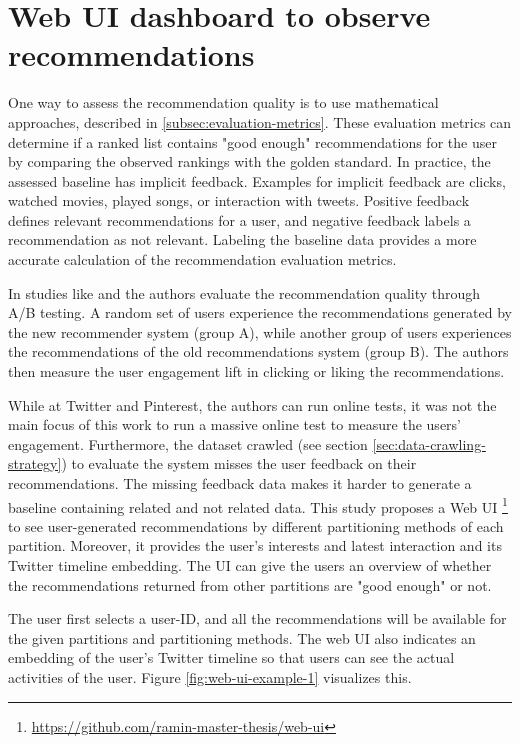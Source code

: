 \section{Web UI dashboard to observe recommendations}
\label{sec:web-ui}
One way to assess the recommendation quality is to use mathematical approaches, described in \ref{subsec:evaluation-metrics}. These evaluation metrics can determine if a ranked list contains "good enough" recommendations for the user by comparing the observed rankings with the golden standard. In practice, the assessed baseline has implicit feedback. Examples for implicit feedback are clicks, watched movies, played songs, or interaction with tweets. Positive feedback defines relevant recommendations for a user, and negative feedback labels a recommendation as not relevant. Labeling the baseline data provides a more accurate calculation of the recommendation evaluation metrics.


In studies like \cite{eksombatchaiPixieSystemRecommending2018} and \cite{goelWhoToFollowSystemTwitter2015} the authors evaluate the recommendation quality through A/B testing. A random set of users experience the recommendations generated by the new recommender system (group A), while another group of users experiences the recommendations of the old recommendations system (group B). The authors then measure the user engagement lift in clicking or liking the recommendations. 


While at Twitter and Pinterest, the authors can run online tests, it was not the main focus of this work to run a massive online test to measure the users' engagement. Furthermore, the dataset crawled (see section \ref{sec:data-crawling-strategy}) to evaluate the system misses the user feedback on their recommendations. The missing feedback data makes it harder to generate a baseline containing related and not related data. This study proposes a Web UI \footnote{\url{https://github.com/ramin-master-thesis/web-ui}} to see user-generated recommendations by different partitioning methods of each partition. Moreover, it provides the user's interests and latest interaction and its Twitter timeline embedding. The UI can give the users an overview of whether the recommendations returned from other partitions are "good enough" or not.


The user first selects a user-ID, and all the recommendations will be available for the given partitions and partitioning methods. The web UI also indicates an embedding of the user's Twitter timeline so that users can see the actual activities of the user. Figure \ref{fig:web-ui-example-1} visualizes this.


